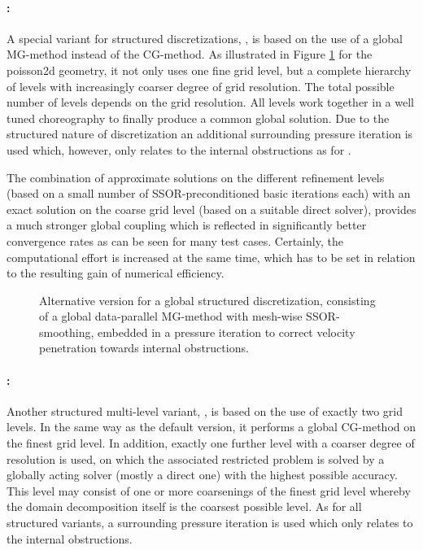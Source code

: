 {\paragraph{\scarcmultigrid{}:}
A special variant for structured discretizations, \scarcmultigrid{}, is based on the use of a global MG-method instead of the CG-method.
As illustrated in Figure \ref{FIG_default_scarc_mg} for the {\ct poisson2d} geometry, it not only uses one fine grid level, but a complete hierarchy of levels with increasingly coarser degree of grid resolution. The total possible number of levels depends on the grid resolution.
All levels work together in a well tuned choreography to finally produce a common global solution. 
Due to the structured nature of discretization an additional surrounding pressure iteration is used which, however, only relates to the internal obstructions as for \scarc{}.

\newpage
The combination of approximate solutions on the different refinement levels (based on a small number of SSOR-preconditioned basic iterations each) with an exact solution on the coarse grid level (based on a suitable direct solver), provides a much stronger global coupling which is reflected in significantly better convergence rates as can be seen for many test cases. Certainly, the computational effort is increased at the same time, which has to be set in relation to the resulting gain of numerical efficiency.


\begin{figure}[h]
\begin{center}

\caption{Alternative version \scarcmultigrid{} for a global structured discretization, consisting of a global data-parallel MG-method with mesh-wise SSOR-smoothing, embedded in a pressure iteration to correct velocity penetration towards internal obstructions.} 
\label{FIG_default_scarc_mg}
\end{center}
\end{figure}

\paragraph{\scarctwolevel{}:}
Another structured multi-level variant, \scarctwolevel{}, is based on the use of exactly two grid levels.
In the same way as the default \scarc{} version, it performs a global CG-method on the finest grid level. In addition, exactly one further level with a coarser degree of resolution is used, on which the associated restricted problem is solved by a globally acting solver (mostly a direct one) with the highest possible accuracy. This level may consist of one or more coarsenings of the finest grid level whereby the domain decomposition itself is the coarsest possible level. As for all structured \scarc{} variants, a surrounding pressure iteration is used which only relates to the internal obstructions.

}
